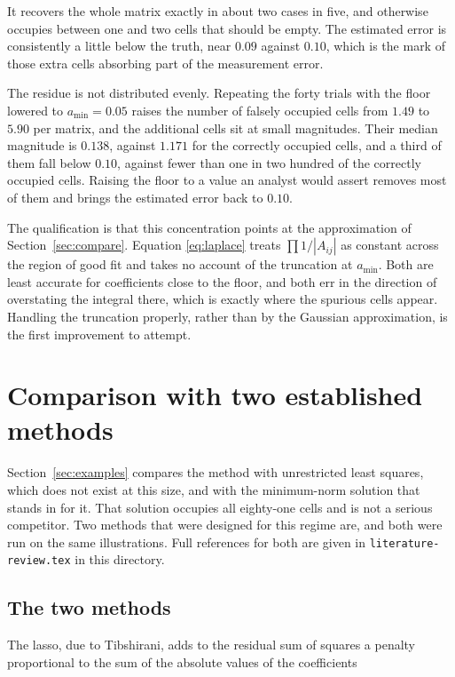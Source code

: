 It recovers the whole matrix exactly in about two cases in five, and otherwise
occupies between one and two cells that should be empty. The estimated error is
consistently a little below the truth, near $0.09$ against $0.10$, which is the mark
of those extra cells absorbing part of the measurement error.

The residue is not distributed evenly. Repeating the forty trials with the floor
lowered to $a_{\min} = 0.05$ raises the number of falsely occupied cells from $1.49$
to $5.90$ per matrix, and the additional cells sit at small magnitudes. Their median
magnitude is $0.138$, against $1.171$ for the correctly occupied cells, and a third of
them fall below $0.10$, against fewer than one in two hundred of the correctly
occupied cells. Raising the floor to a value an analyst would assert removes most of
them and brings the estimated error back to $0.10$.

The qualification is that this concentration points at the approximation of
Section~\ref{sec:compare}. Equation \eqref{eq:laplace} treats
$\prod 1/|A_{ij}|$ as constant across the region of good fit and takes no account of
the truncation at $a_{\min}$. Both are least accurate for coefficients close to the
floor, and both err in the direction of overstating the integral there, which is
exactly where the spurious cells appear. Handling the truncation properly, rather than
by the Gaussian approximation, is the first improvement to attempt.

\section{Comparison with two established methods}
\label{sec:compete}

Section~\ref{sec:examples} compares the method with unrestricted least squares, which
does not exist at this size, and with the minimum-norm solution that stands in for
it. That solution occupies all eighty-one cells and is not a serious competitor. Two
methods that were designed for this regime are, and both were run on the same
illustrations. Full references for both are given in \texttt{literature-review.tex}
in this directory.

\subsection{The two methods}

The lasso, due to Tibshirani, adds to the residual sum of squares a penalty
proportional to the sum of the absolute values of the coefficients

